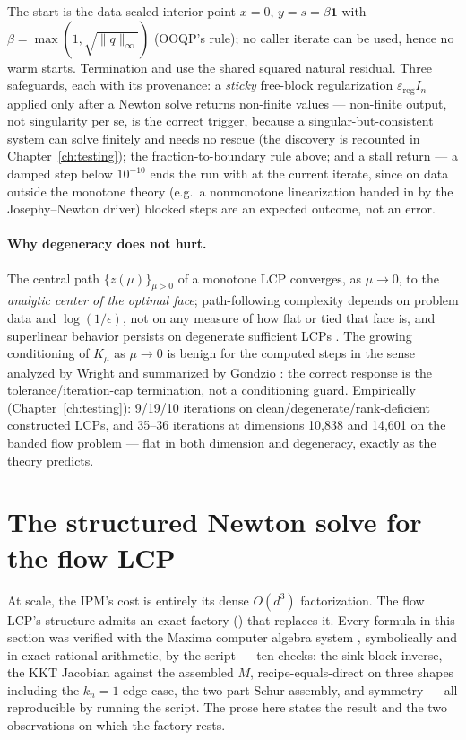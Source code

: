 The start is the data-scaled interior point $x = 0$,
$y = s = \beta\mathbf{1}$ with $\beta = \max(1, \sqrt{\|q\|_\infty})$
(OOQP's rule); no caller iterate can be used, hence no warm starts.
Termination and  use the shared squared natural residual.
Three safeguards, each with its provenance: a \emph{sticky} free-block
regularization $\varepsilon_{\mathrm{reg}} I_n$ applied only after a Newton
solve returns non-finite values --- non-finite output, not singularity per
se, is the correct trigger, because a singular-but-consistent system can
solve finitely and needs no rescue (the discovery is recounted in
Chapter~\ref{ch:testing}); the fraction-to-boundary rule above;
and a stall return --- a damped step below $10^{-10}$ ends the run with
 at the current iterate, since on data outside
the monotone theory (e.g.\ a nonmonotone linearization handed in by the
Josephy--Newton driver) blocked steps are an expected outcome, not an
error.

\paragraph{Why degeneracy does not hurt.} The central path
$\{z(\mu)\}_{\mu > 0}$ of a monotone LCP converges, as $\mu \to 0$, to the
\emph{analytic center of the optimal face}; path-following complexity
depends on problem data and $\log(1/\epsilon)$, not on any measure of how
flat or tied that face is, and superlinear behavior persists on degenerate
sufficient LCPs \cite{potra2009}. The growing conditioning of $K_\mu$ as
$\mu \to 0$ is benign for the computed steps in the sense analyzed by
Wright \cite{wright1997} and summarized by Gondzio \cite{gondzio2012}: the
correct response is the tolerance/iteration-cap termination, not a
conditioning guard. Empirically (Chapter~\ref{ch:testing}): 9/19/10
iterations on clean/degenerate/rank-deficient constructed LCPs, and 35--36
iterations at dimensions 10{,}838 and 14{,}601 on the banded flow problem
--- flat in both dimension and degeneracy, exactly as the theory predicts.

\section{The structured Newton solve for the flow LCP}
\label{sec:a-flownewton}

At scale, the IPM's cost is entirely its dense $O(d^3)$ factorization. The
flow LCP's structure admits an exact factory
() that replaces it. Every formula in this
section was verified with the Maxima computer algebra system
\cite{maxima,macsyma}, symbolically and in exact rational arithmetic, by
the script  --- ten checks: the
sink-block inverse, the KKT Jacobian against the assembled $M$,
recipe-equals-direct on three shapes including the $k_n = 1$ edge case, the
two-part Schur assembly, and symmetry --- all reproducible by running the
script. The prose here states the result and the two observations on which
the factory rests.

